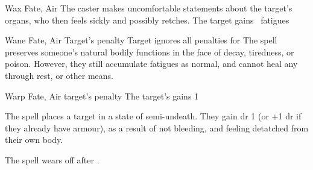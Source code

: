   {}%
  {Wax}%
  {Fate, Air}%
  {}%
  {The caster makes uncomfortable statements about the target's organs, who then feels sickly and possibly retches.
  The target gains ~\glspl{fatigue}}%
  {}

  {}%
  {Wane}%
  {Fate, Air}%
  {Target's  penalty}%
  {Target ignores all  penalties for }%
  {The spell preserves someone's natural bodily functions in the face of decay, tiredness, or poison.
    However, they still accumulate \glspl{fatigue} as normal, and cannot heal any through rest, or other means.}

  {}%
  {Warp}%
  {Fate, Air}%
  {target's  penalty}%
  {The target's gains  1}%
  {
    The spell places a target in a state of semi-undeath.
    They gain \gls{dr} 1 (or +1 \gls{dr} if they already have armour), as a result of not bleeding, and feeling detatched from their own body.%

    The spell wears off after .
  }

